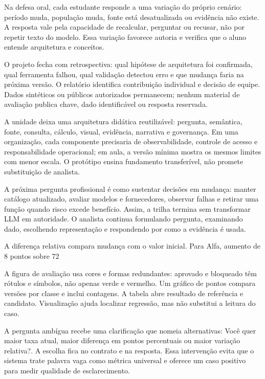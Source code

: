 Na defesa oral, cada estudante responde a uma variação do próprio cenário: período muda, população muda, fonte está desatualizada ou evidência não existe. A resposta vale pela capacidade de recalcular, perguntar ou recusar, não por repetir texto do modelo. Essa variação favorece autoria e verifica que o aluno entende arquitetura e conceitos.

O projeto fecha com retrospectiva: qual hipótese de arquitetura foi confirmada, qual ferramenta falhou, qual validação detectou erro e que mudança faria na próxima versão. O relatório identifica contribuição individual e decisão de equipe. Dados sintéticos ou públicos autorizados permanecem; nenhum material de avaliação publica chave, dado identificável ou resposta reservada.

A unidade deixa uma arquitetura didática reutilizável: pergunta, semântica, fonte, consulta, cálculo, visual, evidência, narrativa e governança. Em uma organização, cada componente precisaria de observabilidade, controle de acesso e responsabilidade operacional; em aula, a versão mínima mostra os mesmos limites com menor escala. O protótipo ensina fundamento transferível, não promete substituição de analista.

A próxima pergunta profissional é como sustentar decisões em mudança: manter catálogo atualizado, avaliar modelos e fornecedores, observar falhas e retirar uma função quando risco excede benefício. Assim, a trilha termina sem transformar LLM em autoridade. O analista continua formulando pergunta, examinando dado, escolhendo representação e respondendo por como a evidência é usada.

A diferença relativa compara mudança com o valor inicial. Para Alfa, aumento de 8 pontos sobre 72%

A figura de avaliação usa cores e formas redundantes: aprovado e bloqueado têm rótulos e símbolos, não apenas verde e vermelho. Um gráfico de pontos compara versões por classe e inclui contagens. A tabela abre resultado de referência e candidato. Visualização ajuda localizar regressão, mas não substitui a leitura do caso.

A pergunta ambígua recebe uma clarificação que nomeia alternativas: Você quer maior taxa atual, maior diferença em pontos percentuais ou maior variação relativa?. A escolha fica no contrato e na resposta. Essa intervenção evita que o sistema trate palavra vaga como métrica universal e oferece um caso positivo para medir qualidade de esclarecimento.

